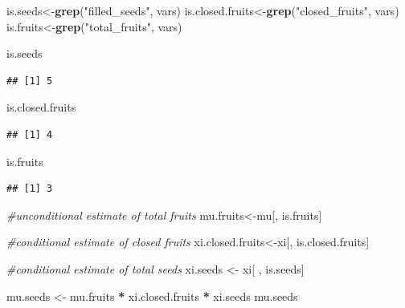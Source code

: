 \documentclass[
]{article}
\newenvironment{Shaded}{\begin{snugshade}}{\end{snugshade}}
\newcommand{\CommentTok}[1]{\textcolor[rgb]{0.56,0.35,0.01}{\textit{#1}}}
\newcommand{\FunctionTok}[1]{\textcolor[rgb]{0.13,0.29,0.53}{\textbf{#1}}}
\newcommand{\NormalTok}[1]{#1}
\newcommand{\OtherTok}[1]{\textcolor[rgb]{0.56,0.35,0.01}{#1}}
\newcommand{\SpecialCharTok}[1]{\textcolor[rgb]{0.81,0.36,0.00}{\textbf{#1}}}
\newcommand{\StringTok}[1]{\textcolor[rgb]{0.31,0.60,0.02}{#1}}
\begin{document}
\begin{Shaded}
\begin{Highlighting}[]
\NormalTok{is.seeds}\OtherTok{\textless{}{-}}\FunctionTok{grep}\NormalTok{(}\StringTok{"filled\_seeds"}\NormalTok{, vars)}
\NormalTok{is.closed.fruits}\OtherTok{\textless{}{-}}\FunctionTok{grep}\NormalTok{(}\StringTok{"closed\_fruits"}\NormalTok{, vars)}
\NormalTok{is.fruits}\OtherTok{\textless{}{-}}\FunctionTok{grep}\NormalTok{(}\StringTok{"total\_fruits"}\NormalTok{, vars)}

\NormalTok{is.seeds}
\end{Highlighting}
\end{Shaded}

\begin{verbatim}
## [1] 5
\end{verbatim}

\begin{Shaded}
\begin{Highlighting}[]
\NormalTok{is.closed.fruits}
\end{Highlighting}
\end{Shaded}

\begin{verbatim}
## [1] 4
\end{verbatim}

\begin{Shaded}
\begin{Highlighting}[]
\NormalTok{is.fruits}
\end{Highlighting}
\end{Shaded}

\begin{verbatim}
## [1] 3
\end{verbatim}

\begin{Shaded}
\begin{Highlighting}[]
\CommentTok{\#unconditional estimate of total fruits }
\NormalTok{mu.fruits}\OtherTok{\textless{}{-}}\NormalTok{mu[, is.fruits]}

\CommentTok{\#conditional estimate of closed fruits }
\NormalTok{xi.closed.fruits}\OtherTok{\textless{}{-}}\NormalTok{xi[, is.closed.fruits]}

\CommentTok{\#conditional estimate of total seeds }
\NormalTok{xi.seeds }\OtherTok{\textless{}{-}}\NormalTok{ xi[ , is.seeds]}

\NormalTok{mu.seeds }\OtherTok{\textless{}{-}}\NormalTok{ mu.fruits }\SpecialCharTok{*}\NormalTok{ xi.closed.fruits }\SpecialCharTok{*}\NormalTok{ xi.seeds}
\NormalTok{mu.seeds}
\end{Highlighting}
\end{Shaded}
\end{document}
